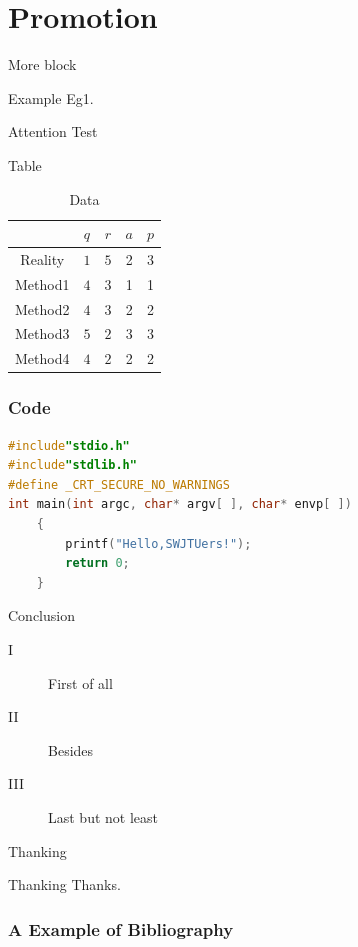 \documentclass[11pt]{SWJTUBeamer}
\begin{document}
\section{Promotion}

\begin{frame}{More block}
    \begin{exampleblock}{Example}
        Eg1.
    \end{exampleblock}
    \begin{alertblock}{Attention}
        Test
    \end{alertblock}
\end{frame}

\begin{frame}{Table}
    \begin{table}[]
        \centering
        \caption{Data}
        \label{tab1}
        \begin{tabular}{@{}ccccc@{}}
            \toprule
                    & $q$ & $r$ & $a$ & $p$ \\ \midrule
            Reality & $1$ & $5$ & 2   & 3   \\
            Method1 & $4$ & $3$ & 1   & 1   \\
            Method2 & $4$ & $3$ & 2   & 2   \\
            Method3 & $5$ & $2$ & 3   & 3   \\
            Method4 & $4$ & $2$ & 2   & 2   \\ \bottomrule
        \end{tabular}
    \end{table}
\end{frame}

\begin{frame}[fragile]
    \frametitle{Code}
    \begin{lstlisting}[language=c]
#include"stdio.h"
#include"stdlib.h"
#define _CRT_SECURE_NO_WARNINGS
int main(int argc, char* argv[ ], char* envp[ ])
    {
        printf("Hello,SWJTUers!");
        return 0;
    }
\end{lstlisting}
\end{frame}

\begin{frame}{Conclusion}
    \begin{description}
        \item[I] First of all
        \item[II] Besides
        \item[III] Last but not least
    \end{description}
\end{frame}

\begin{frame}{Thanking}
    \begin{block}{Thanking}
        Thanks.
    \end{block}
\end{frame}

\begin{frame}[allowframebreaks]
    \frametitle{A Example of Bibliography}
    \nocite{*}
    \printbibliography
\end{frame}
\end{document}
